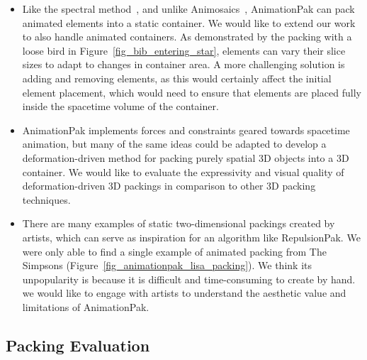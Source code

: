 \begin{itemize}
\item {}
Like the spectral method~\cite{Dalal2006}, and unlike
	Animosaics~\cite{Smith2005}, AnimationPak can pack animated 
	elements into a static container.  We would like to extend
	our work to also handle animated containers. 
	\newtext
	{
	As demonstrated by the packing with a loose bird in Figure~\ref{fig_bib_entering_star},
	elements can vary their slice sizes to adapt to changes in container area.
	A more challenging solution is adding and removing elements,
	as this would certainly affect the initial element placement, which 
	would need to ensure that elements are placed fully inside the
	spacetime volume of the container.  		
	}

\item {}
AnimationPak implements forces and constraints geared towards 
	spacetime animation, but many of the same ideas could be adapted
	to develop a deformation-driven method for packing purely spatial
	3D objects into a 3D container.  We would like to evaluate the
	expressivity and visual quality of deformation-driven 3D packings 
	in comparison to other 3D packing techniques.

\item {}
There are many examples of static two-dimensional packings
	created by artists, which can serve as inspiration for an algorithm like RepulsionPak.  
	We were only able to find a single example of animated packing from The Simpsons (Figure~\ref{fig_animationpak_lisa_packing}). 
	We think its unpopularity is because it is difficult and time-consuming to create by hand.
	 we would like to engage with artists to understand the aesthetic value and limitations
	of AnimationPak.

\end{itemize}

\subsection{Packing Evaluation}


